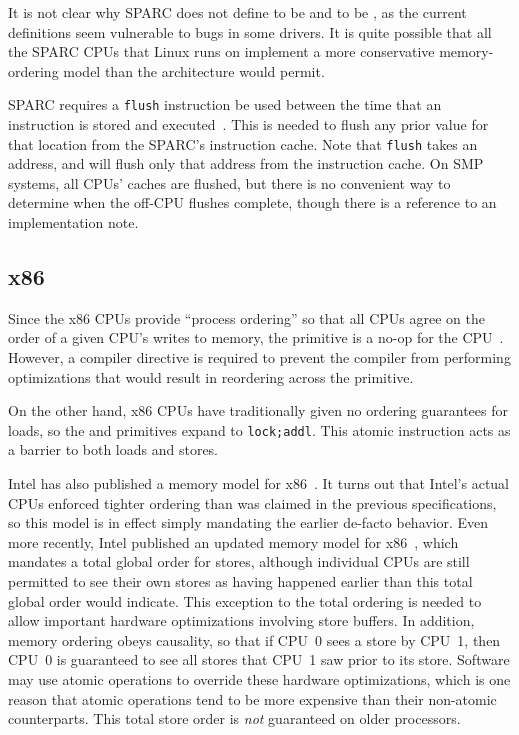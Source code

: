 It is not clear why SPARC does not define  to be
 and  to be
,
as the current definitions seem vulnerable to bugs in some drivers.
It is quite possible that all the SPARC CPUs that Linux runs on
implement a more conservative memory-ordering model than the architecture
would permit.

SPARC requires a {\tt flush} instruction be used between the time that
an instruction is stored and executed~\cite{SPARC94}.
This is needed to flush any prior value for that location from
the SPARC's instruction cache.
Note that {\tt flush} takes an address, and will flush only that address
from the instruction cache.
On SMP systems, all CPUs' caches are flushed, but there is no
convenient way to determine when the off-CPU flushes complete,
though there is a reference to an implementation note.

\subsection{x86}

Since the x86 CPUs provide ``process ordering'' so that all CPUs agree
on the order of a given CPU's writes to memory, the  primitive
is a no-op for the CPU~\cite{IntelXeonV3-96a}.
However, a compiler directive is required to
prevent the compiler from performing optimizations that would result
in reordering across the  primitive.

On the other hand, x86 CPUs have traditionally given
no ordering guarantees for loads, so
the  and  primitives expand to {\tt lock;addl}.
This atomic instruction acts as a barrier to both loads and stores.

Intel has also published a memory model for
x86~\cite{Intelx86MemoryOrdering2007}.
It turns out that Intel's actual CPUs enforced tighter ordering than
was claimed in the previous specifications, so this model is in effect
simply mandating the earlier de-facto behavior.
Even more recently, Intel published an updated memory model for
x86~\cite[Section 8.2]{Intel64IA32v3A2011}, which mandates a total global order
for stores, although individual CPUs are still permitted to see their
own stores as having happened earlier than this total global order
would indicate.
This exception to the total ordering is needed to allow important
hardware optimizations involving store buffers.
In addition, memory ordering obeys causality, so that if CPU~0 sees a
store by CPU~1, then CPU~0 is guaranteed to see all stores that CPU~1
saw prior to its store.
Software may use atomic operations to override these hardware optimizations,
which is one reason that atomic operations tend to be more expensive
than their non-atomic counterparts.
This total store order is \emph{not} guaranteed on older processors.

